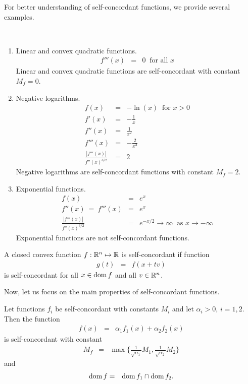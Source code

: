 For better understanding of self-concordant functions, we provide several examples.

\begin{example}~\\[-0.5cm]
  \begin{enumerate}
    \item Linear and convex quadratic functions.
      \begin{eqnarray}
        f'''(x) &=& 0\ \text{ for all } x
      \end{eqnarray}
      Linear and convex quadratic functions are self-concordant with constant $M_f = 0$.
    \item Negative logarithms.
      \begin{eqnarray}
        f(x) &=& -\ln(x)\ \text{ for } x>0\\
        f'(x) &=& -\frac{1}{x}\\
        f''(x) &=& \frac{1}{x^2}\\
        f'''(x) &=& -\frac{2}{x^3}\\
        \frac{|f'''(x)|}{f''(x)^{3/2}} &=& 2
      \end{eqnarray}
      Negative logarithms are self-concordant functions with constant $M_f = 2$.

    \item Exponential functions.
      \begin{eqnarray}
        f(x) &=& e^x\\
        f''(x) \ =\ f'''(x) &=& e^x\\
        \frac{|f'''(x)|}{f''(x)^{3/2}} &=& e^{-x/2} \rightarrow\infty \ \text{ as } x\rightarrow-\infty
      \end{eqnarray}
      Exponential functions are not self-concordant functions.
  \end{enumerate}
\end{example}

\begin{definition}
  A closed convex function $f: \mathbb{R}^n \mapsto \mathbb{R}$ is self-concordant if function
  \begin{eqnarray}
    g(t) &=& f(x + tv)
  \end{eqnarray}
  is self-concordant for all $x\in\operatorname{dom} f$ and all $v\in\mathbb{R}^n$.
\end{definition}

Now, let us focus on the main properties of self-concordant functions.

\begin{theorem}
  Let functions $f_i$ be self-concordant with constants $M_i$  and let $\alpha_i > 0$, $i = 1,2$. Then the function
 \begin{eqnarray}
   f(x) &=& \alpha_1f_1(x) + \alpha_2f_2(x)
 \end{eqnarray}
 is self-concordant with constant
 \begin{eqnarray}
   M_f &=& \max \bigg\{\frac{1}{\sqrt{\alpha_1}}M_1, \frac{1}{\sqrt{\alpha_2}}M_2\bigg\}
 \end{eqnarray}
 and
 \begin{eqnarray}
   \operatorname{dom} f &=& \operatorname{dom} f_1 \cap \operatorname{dom} f_2.
 \end{eqnarray}
\end{theorem}

